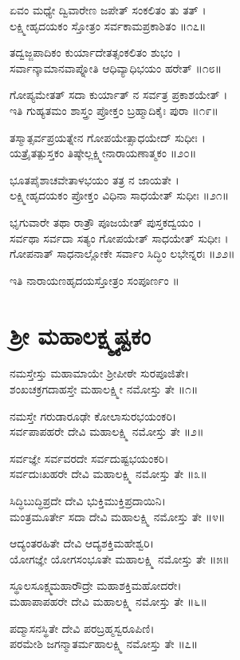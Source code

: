 	ಏವಂ ಮಧ್ಯೇ ದ್ವಿವಾರೇಣ ಜಪೇತ್ ಸಂಕಲಿತಂ ತು ತತ್ ।\\
	ಲಕ್ಷ್ಮೀಹೃದಯಕಂ ಸ್ತೋತ್ರಂ ಸರ್ವಕಾಮಪ್ರಕಾಶಿತಂ ॥೧೭॥

ತದ್ವಜ್ಜಪಾದಿಕಂ ಕುರ್ಯಾದೇತತ್ಸಂಕಲಿತಂ ಶುಭಂ ।\\
ಸರ್ವಾನ್ಕಾಮಾನವಾಪ್ನೋತಿ ಆಧಿವ್ಯಾಧಿಭಯಂ ಹರೇತ್ ॥೧೮॥

	ಗೋಪ್ಯಮೇತತ್ ಸದಾ ಕುರ್ಯಾತ್ ನ ಸರ್ವತ್ರ ಪ್ರಕಾಶಯೇತ್ ।\\
	ಇತಿ ಗುಹ್ಯತಮಂ ಶಾಸ್ತ್ರಂ ಪ್ರೋಕ್ತಂ ಬ್ರಹ್ಮಾದಿಕೈಃ ಪುರಾ ॥೧೯॥

ತಸ್ಮಾತ್ಸರ್ವಪ್ರಯತ್ನೇನ ಗೋಪಯೇತ್ಸಾಧಯೇದ್ ಸುಧೀಃ ।\\
ಯತ್ರೈತತ್ಪುಸ್ತಕಂ ತಿಷ್ಠೇಲ್ಲಕ್ಷ್ಮೀನಾರಾಯಣಾತ್ಮಕಂ ॥೨೦॥

	ಭೂತಪೈಶಾಚವೇತಾಳಭಯಂ ತತ್ರ ನ ಜಾಯತೇ ।\\
	ಲಕ್ಷ್ಮೀಹೃದಯಕಂ ಪ್ರೋಕ್ತಂ ವಿಧಿನಾ ಸಾಧಯೇತ್ ಸುಧೀಃ ॥೨೧॥

ಭೃಗುವಾರೇ ತಥಾ ರಾತ್ರೌ ಪೂಜಯೇತ್ ಪುಸ್ತಕದ್ವಯಂ ।\\
ಸರ್ವಥಾ ಸರ್ವದಾ ಸತ್ಯಂ ಗೋಪಯೇತ್ ಸಾಧಯೇತ್ ಸುಧೀಃ ।\\
	ಗೋಪನಾತ್ ಸಾಧನಾಲ್ಲೋಕೇ ಸರ್ವಾಂ ಸಿದ್ಧಿಂ ಲಭೇನ್ನರಃ ॥೨೨॥

	ಇತಿ ನಾರಾಯಣಹೃದಯಸ್ತೋತ್ರಂ ಸಂಪೂರ್ಣಂ ॥


\section{ ಶ್ರೀ ಮಹಾಲಕ್ಷ್ಮ್ಯಷ್ಟಕಂ}
ನಮಸ್ತೇಸ್ತು ಮಹಾಮಾಯೇ ಶ್ರೀಪೀಠೇ ಸುರಪೂಜಿತೇ।\\
ಶಂಖಚಕ್ರಗದಾಹಸ್ತೇ ಮಹಾಲಕ್ಷ್ಮೀ ನಮೋಸ್ತು ತೇ ॥೧॥

	ನಮಸ್ತೇ ಗರುಡಾರೂಢೇ ಕೋಲಾಸುರಭಯಂಕರಿ।\\
	ಸರ್ವಪಾಪಹರೇ ದೇವಿ ಮಹಾಲಕ್ಷ್ಮಿ ನಮೋಸ್ತು ತೇ ॥೨॥

ಸರ್ವಜ್ಞೇ ಸರ್ವವರದೇ ಸರ್ವದುಷ್ಟಭಯಂಕರಿ।\\
ಸರ್ವದುಃಖಹರೇ ದೇವಿ ಮಹಾಲಕ್ಷ್ಮಿ ನಮೋಸ್ತು ತೇ ॥೩॥

	ಸಿದ್ಧಿಬುದ್ಧಿಪ್ರದೇ ದೇವಿ ಭುಕ್ತಿಮುಕ್ತಿಪ್ರದಾಯಿನಿ।\\
	ಮಂತ್ರಮೂರ್ತೇ ಸದಾ ದೇವಿ ಮಹಾಲಕ್ಷ್ಮಿ ನಮೋಸ್ತು ತೇ ॥೪॥

ಆದ್ಯಂತರಹಿತೇ ದೇವಿ ಆದ್ಯಶಕ್ತಿಮಹೇಶ್ವರಿ।\\
ಯೋಗಜ್ಞೇ ಯೋಗಸಂಭೂತೇ ಮಹಾಲಕ್ಷ್ಮಿ ನಮೋಸ್ತು ತೇ ॥೫॥

	ಸ್ಥೂಲಸೂಕ್ಷ್ಮಮಹಾರೌದ್ರೇ ಮಹಾಶಕ್ತಿಮಹೋದರೇ।\\
	ಮಹಾಪಾಪಹರೇ ದೇವಿ ಮಹಾಲಕ್ಷ್ಮಿ ನಮೋಸ್ತು ತೇ ॥೬॥

ಪದ್ಮಾಸನಸ್ಥಿತೇ ದೇವಿ ಪರಬ್ರಹ್ಮಸ್ವರೂಪಿಣಿ।\\
ಪರಮೇಶಿ ಜಗನ್ಮಾತರ್ಮಹಾಲಕ್ಷ್ಮಿ ನಮೋಸ್ತು ತೇ ॥೭॥

